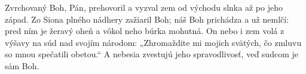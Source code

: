 Zvrchovaný Boh, Pán, prehovoril
a vyzval zem 
\versseparator
od východu slnka až po jeho západ.
Zo Siona plného nádhery zažiaril Boh;
\versseparator
náš Boh prichádza a už nemlčí:
\versseparator
pred ním je žeravý oheň
a vôkol neho búrka mohutná.
\versseparator
On nebo i zem volá z výšavy
na súd nad svojím národom:
\versseparator
„Zhromaždite mi mojich svätých,
čo zmluvu so mnou spečatili obetou.“
\versseparator
A nebesia zvestujú jeho spravodlivosť,
veď sudcom je sám Boh.